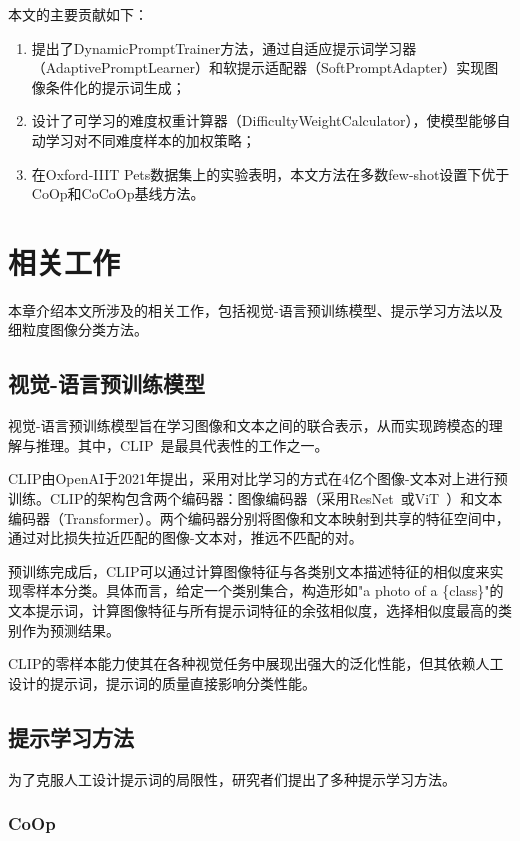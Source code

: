 \documentclass{HDU-Bachelor-Thesis}
\begin{document}
本文的主要贡献如下：

\begin{enumerate}
\item 提出了DynamicPromptTrainer方法，通过自适应提示词学习器（AdaptivePromptLearner）和软提示适配器（SoftPromptAdapter）实现图像条件化的提示词生成；
\item 设计了可学习的难度权重计算器（DifficultyWeightCalculator），使模型能够自动学习对不同难度样本的加权策略；
\item 在Oxford-IIIT Pets数据集上的实验表明，本文方法在多数few-shot设置下优于CoOp和CoCoOp基线方法。
\end{enumerate}

\section{相关工作}

本章介绍本文所涉及的相关工作，包括视觉-语言预训练模型、提示学习方法以及细粒度图像分类方法。

\subsection{视觉-语言预训练模型}

视觉-语言预训练模型旨在学习图像和文本之间的联合表示，从而实现跨模态的理解与推理。其中，CLIP~\cite{clip2021}是最具代表性的工作之一。

CLIP由OpenAI于2021年提出，采用对比学习的方式在4亿个图像-文本对上进行预训练。CLIP的架构包含两个编码器：图像编码器（采用ResNet~\cite{he2016deep}或ViT~\cite{dosovitskiy2021image}）和文本编码器（Transformer）。两个编码器分别将图像和文本映射到共享的特征空间中，通过对比损失拉近匹配的图像-文本对，推远不匹配的对。

预训练完成后，CLIP可以通过计算图像特征与各类别文本描述特征的相似度来实现零样本分类。具体而言，给定一个类别集合，构造形如"a photo of a \{class\}"的文本提示词，计算图像特征与所有提示词特征的余弦相似度，选择相似度最高的类别作为预测结果。

CLIP的零样本能力使其在各种视觉任务中展现出强大的泛化性能，但其依赖人工设计的提示词，提示词的质量直接影响分类性能。

\subsection{提示学习方法}

为了克服人工设计提示词的局限性，研究者们提出了多种提示学习方法。

\subsubsection{CoOp}
\end{document}
